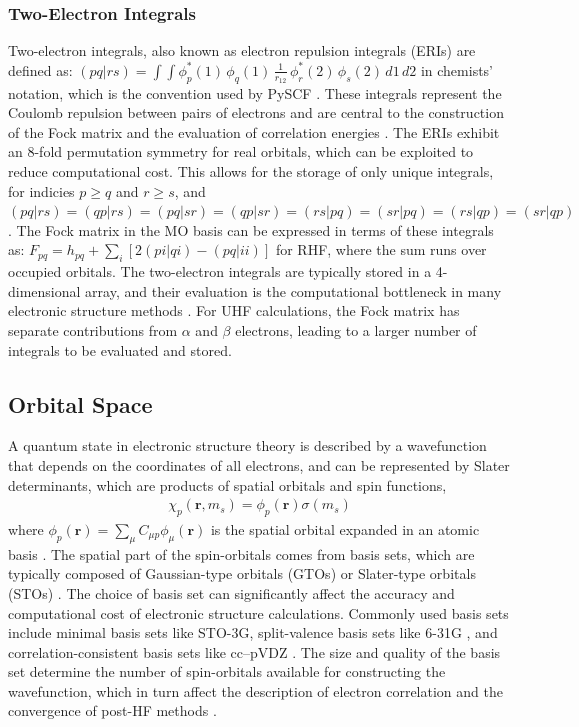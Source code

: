 \subsubsection{Two-Electron Integrals}
\label{subsubsec:theory_mo_integrals_two_electron}

Two-electron integrals, also known as electron repulsion integrals (ERIs) are defined as: $(pq|rs) = \int\!\int \phi_p^*(1)\,\phi_q(1)\,\frac{1}{r_{12}}\,\phi_r^*(2)\,\phi_s(2)\,d1\,d2$ in chemists' notation, which is the convention used by PySCF \cite{Sun2020}. These integrals represent the Coulomb repulsion between pairs of electrons and are central to the construction of the Fock matrix and the evaluation of correlation energies \cite{Helgaker2000}. The ERIs exhibit an 8-fold permutation symmetry for real orbitals, which can be exploited to reduce computational cost. This allows for the storage of only unique integrals, for indicies $p \geq q$ and $r \geq s$, and $(pq|rs) = (qp|rs) = (pq|sr) = (qp|sr) = (rs|pq) = (sr|pq) = (rs|qp) = (sr|qp)$. The Fock matrix in the MO basis can be expressed in terms of these integrals as: $F_{pq} = h_{pq} + \sum_i [2(pi|qi) - (pq|ii)]$ for RHF, where the sum runs over occupied orbitals. The two-electron integrals are typically stored in a 4-dimensional array, and their evaluation is the computational bottleneck in many electronic structure methods \cite{Jensen2017}. For UHF calculations, the Fock matrix has separate contributions from $\alpha$ and $\beta$ electrons, leading to a larger number of integrals to be evaluated and stored.


\subsection{Orbital Space}
\label{subsec:theory_orbital_space}

A quantum state in electronic structure theory is described by a wavefunction that depends on the coordinates of all electrons, and can be represented by Slater determinants, which are products of spatial orbitals and spin functions, 
\begin{align}
    \chi_p(\mathbf{r}, m_s) = \phi_p(\mathbf{r}) \sigma(m_s)
\end{align}
where $\phi_p(\mathbf{r}) = \sum_\mu C_{\mu p} \phi_\mu(\mathbf{r})$ is the spatial orbital expanded in an atomic basis \cite{Helgaker2000}. The spatial part of the spin-orbitals comes from basis sets, which are typically composed of Gaussian-type orbitals (GTOs) or Slater-type orbitals (STOs) \cite{Jensen2017}. The choice of basis set can significantly affect the accuracy and computational cost of electronic structure calculations. Commonly used basis sets include minimal basis sets like STO-3G, split-valence basis sets like 6-31G \cite{ditchfield1971a, hehre1972a, dill1975a}, and correlation-consistent basis sets like cc--pVDZ \cite{dunning1989}. The size and quality of the basis set determine the number of spin-orbitals available for constructing the wavefunction, which in turn affect the description of electron correlation and the convergence of post-HF methods \cite{Jensen2017, Helgaker2000}. 

